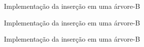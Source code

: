 \begin{frame}[fragile]{Implementação da inserção em uma árvore-B}
\end{frame}

\begin{frame}[fragile]{Implementação da inserção em uma árvore-B}
\end{frame}

\begin{frame}[fragile]{Implementação da inserção em uma árvore-B}
\end{frame}








